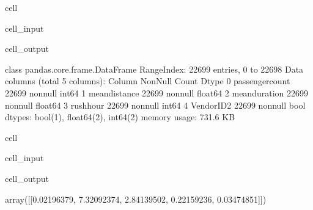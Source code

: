 \documentclass[letterpaper,10pt,english]{sphinxmanual}
\begin{document}
\begin{sphinxuseclass}{cell}
\begin{sphinxuseclass}{cell_input}
\begin{sphinxVerbatim}[commandchars=\\\{\}]
\end{sphinxVerbatim}

\end{sphinxuseclass}
\begin{sphinxuseclass}{cell_output}
\begin{sphinxVerbatim}[commandchars=\\\{\}]
\PYGZlt{}class \PYGZsq{}pandas.core.frame.DataFrame\PYGZsq{}\PYGZgt{}
RangeIndex: 22699 entries, 0 to 22698
Data columns (total 5 columns):
 \PYGZsh{}   Column           Non\PYGZhy{}Null Count  Dtype  
\PYGZhy{}\PYGZhy{}\PYGZhy{}  \PYGZhy{}\PYGZhy{}\PYGZhy{}\PYGZhy{}\PYGZhy{}\PYGZhy{}           \PYGZhy{}\PYGZhy{}\PYGZhy{}\PYGZhy{}\PYGZhy{}\PYGZhy{}\PYGZhy{}\PYGZhy{}\PYGZhy{}\PYGZhy{}\PYGZhy{}\PYGZhy{}\PYGZhy{}\PYGZhy{}  \PYGZhy{}\PYGZhy{}\PYGZhy{}\PYGZhy{}\PYGZhy{}  
 0   passenger\PYGZus{}count  22699 non\PYGZhy{}null  int64  
 1   mean\PYGZus{}distance    22699 non\PYGZhy{}null  float64
 2   mean\PYGZus{}duration    22699 non\PYGZhy{}null  float64
 3   rush\PYGZus{}hour        22699 non\PYGZhy{}null  int64  
 4   VendorID\PYGZus{}2       22699 non\PYGZhy{}null  bool   
dtypes: bool(1), float64(2), int64(2)
memory usage: 731.6 KB
\end{sphinxVerbatim}

\end{sphinxuseclass}
\end{sphinxuseclass}
\begin{sphinxuseclass}{cell}
\begin{sphinxuseclass}{cell_input}
\begin{sphinxVerbatim}[commandchars=\\\{\}]
\end{sphinxVerbatim}

\end{sphinxuseclass}
\begin{sphinxuseclass}{cell_output}
\begin{sphinxVerbatim}[commandchars=\\\{\}]
array([[0.02196379, 7.32092374, 2.84139502, 0.22159236, 0.03474851]])
\end{sphinxVerbatim}

\end{sphinxuseclass}
\end{sphinxuseclass}
\end{document}
